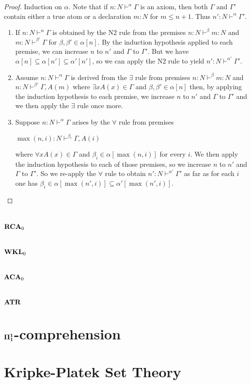\documentclass[8pt]{article}
\theoremstyle{definition}
\theoremstyle{definition}
\theoremstyle{definition}
\theoremstyle{definition}
\theoremstyle{definition}
\theoremstyle{definition}
\theoremstyle{definition}
\theoremstyle{definition}
\theoremstyle{definition}
\theoremstyle{definition}
\theoremstyle{definition}
\theoremstyle{definition}
\theoremstyle{definition}
\theoremstyle{question}
\begin{document}
\begin{proof}
  Induction on $\alpha$. Note that if $n : N \vdash^{\alpha} \Gamma$ is an axiom, then both
  $\Gamma$ and $\Gamma'$ contain either a true atom or a declaration $m : N$ for $m \leq n + 1$. 
  Thus $n' : N \vdash^{\alpha} \Gamma'$.
  \begin{enumerate}
    \item If $n : N \vdash^{\alpha} \Gamma$ is obtained by the N2 rule from the premises
    $n : N \vdash^{\beta} m : N$ and $m : N \vdash^{\beta'} \Gamma$ for 
    $\beta, \beta' \in \alpha[n]$. By the induction hypothesis applied to each premise, we can increase $n$
    to $n'$ and $\Gamma$ to $\Gamma'$. But we have $\alpha[n] \subseteq \alpha[n'] \subseteq \alpha'[n']$,
    so we can apply the N2 rule to yield $n' : N \vdash^{\alpha'} \Gamma'$.
    \item Assume $n : N \vdash^{\alpha} \Gamma$ is derived from the $\exists$ rule from premises
    $n : N \vdash^{\beta} m : N$ and $n : N \vdash^{\beta'} \Gamma, A(m)$ where $\exists x A(x) \in \Gamma$
    and $\beta, \beta' \in \alpha[n]$ then, by applying the induction hypothesis to each premise,
    we increase $n$ to $n'$ and $\Gamma$ to $\Gamma'$ and we then apply the $\exists$ rule once more.
    \item Suppose $n : N \vdash^{\alpha} \Gamma$ arises by the $\forall$ rule from premises
    \begin{center}
      $\max(n, i) : N \vdash^{\beta_i} \Gamma, A(i)$
    \end{center}
    where $\forall x A(x) \in \Gamma$ and $\beta_i \in \alpha[\max(n, i)]$ for every $i$.
    We then apply the induction hypothesis to each of those premises, so we increase $n$ to $n'$ and $\Gamma$ to $\Gamma'$.
    So we re-apply the $\forall$ rule to obtain $n' : N \vdash^{\alpha'} \Gamma'$ as far as for each $i$ one has
    $\beta_i \in \alpha[\max(n', i)] \subseteq \alpha'[\max(n', i)]$.
  \end{enumerate}
\end{proof}

\section{${\bf RCA}_0$}

\section{${\bf WKL}_0$}

\section{${\bf ACA}_0$}

\section{${\bf ATR}$}

\section{${\bf \Pi_1^1}$-comprehension}

\section{Kripke-Platek Set Theory}




\end{document}
